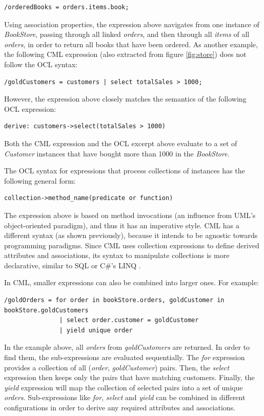 \verbatimfont{\scriptsize}
\begin{verbatim}
/orderedBooks = orders.items.book;
\end{verbatim}

Using association properties, the expression above navigates from one instance of \emph{BookStore}, passing through all linked \emph{orders}, and then through all \emph{items} of all \emph{orders}, in order to return all books that have been ordered.
As another example,
the following CML expression (also extracted from figure \ref{fig:store}) does not follow the OCL syntax:

\verbatimfont{\scriptsize}
\begin{verbatim}
/goldCustomers = customers | select totalSales > 1000;
\end{verbatim}

However, the expression above closely matches the semantics of the following OCL expression:

\verbatimfont{\scriptsize}
\begin{verbatim}
derive: customers->select(totalSales > 1000)
\end{verbatim}

Both the CML expression and the OCL excerpt above evaluate to a set of \emph{Customer} instances
that have bought more than 1000 in the \emph{BookStore}.

The OCL syntax for expressions that process collections of instances has the following general form:

\verbatimfont{\scriptsize}
\begin{verbatim}
collection->method_name(predicate or function)
\end{verbatim}

The expression above is based on method invocations
(an influence from UML's object-oriented paradigm),
and thus it has an imperative style. CML has a different syntax (as shown previously),
because it intends to be agnostic towards programming paradigms.
Since CML uses collection expressions to define derived attributes and associations,
its syntax to manipulate collections is more declarative,
similar to SQL \cite{sql} or C\#'s LINQ \cite{torgersen}.

In CML, smaller expressions can also be combined into larger ones. For example:

\verbatimfont{\scriptsize}
\begin{verbatim}
/goldOrders = for order in bookStore.orders, goldCustomer in bookStore.goldCustomers
               | select order.customer = goldCustomer
               | yield unique order
 \end{verbatim}

In the example above, all \emph{orders} from \emph{goldCustomers} are returned.
In order to find them, the sub-expressions are evaluated sequentially.
The \emph{for} expression provides a collection of all (\emph{order}, \emph{goldCustomer}) pairs.
Then, the \emph{select} expression then keeps only the pairs that have matching customers.
Finally, the \emph{yield} expression will map the collection of selected pairs into a set of unique \emph{orders}.
Sub-expressions like \emph{for}, \emph{select} and \emph{yield} can be combined in different configurations
in order to derive any required attributes and associations.
